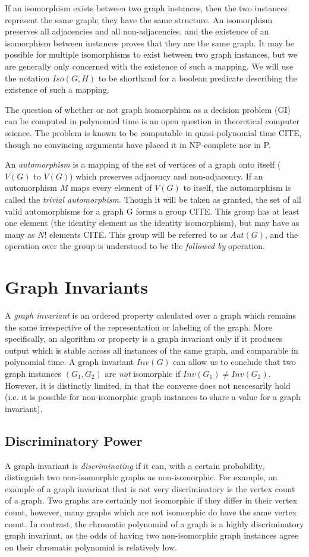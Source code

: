 \documentclass[11pt,a4paper]{report}
\begin{document}
If an isomorphism exists between two graph instances, then the two instances represent the same graph; they have the same structure.
An isomorphism preserves all adjacencies and all non-adjacencies, and the existence of an isomorphism between instances proves that they are the same graph.
It may be possible for multiple isomorphisms to exist between two graph instances, but we are generally only concerned with the existence of such a mapping.
We will use the notation $Iso(G, H)$ to be shorthand for a boolean predicate describing the existence of such a mapping.

The question of whether or not graph isomorphism as a decision problem (GI) can be computed in polynomial time is an open question in theoretical computer science.
The problem is known to be computable in quasi-polynomial time CITE, though no convincing arguments have placed it in NP-complete nor in P.

An \emph{automorphism} is a mapping of the set of vertices of a graph onto itself ($V(G)$ to $V(G)$) which preserves adjacency and non-adjacency.
If an automorphism $M$ maps every element of $V(G)$ to itself, the automorphism is called the \emph{trivial automorphism}.
Though it will be taken as granted, the set of all valid automorphisms for a graph G forms a group CITE.
This group has at least one element (the identity element as the identity isomorphism), but may have as many as $N!$ elements CITE.
This group will be referred to as $Aut(G)$, and the operation over the group is understood to be the \emph{followed by} operation.

\section{Graph Invariants}
A \emph{graph invariant} is an ordered property calculated over a graph which remains the same irrespective of the representation or labeling of the graph.
More specifically, an algorithm or property is a graph invariant only if it produces output which is stable across all instances of the same graph, and comparable in polynomial time.
A graph invariant $Inv(G)$ can allow us to conclude that two graph instances $(G_1, G_2)$ are \emph{not} isomorphic if $Inv(G_1) \neq Inv(G_2)$.
However, it is distinctly limited, in that the converse does not nescesarily hold (i.e. it is possible for non-isomorphic graph instances to share a value for a graph invariant).

\subsection{Discriminatory Power}
A graph invariant is \emph{discriminating} if it can, with a certain probability, distinguish two non-isomorphic graphs as non-isomorphic.
For example, an example of a graph invariant that is not very discriminatory is the vertex count of a graph.
Two graphs are certainly not isomorphic if they differ in their vertex count, however, many graphs which are not isomorphic do have the same vertex count.
In contrast, the chromatic polynomial of a graph is a highly discriminatory graph invariant, as the odds of having two non-isomorphic graph instances agree on their chromatic polynomial is relatively low.
\end{document}
